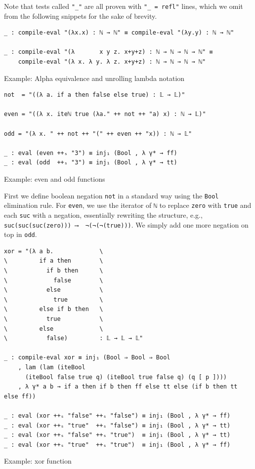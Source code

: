 Note that tests called \verb$"_"$ are all proven with \verb$"_ = refl"$ lines, which we omit from the following snippets for the sake of brevity.

\begin{listing}[H]
\begin{verbatim}
_ : compile-eval "(λx.x) : ℕ → ℕ" ≡ compile-eval "(λy.y) : ℕ → ℕ"

_ : compile-eval "(λ       x y z. x+y+z) : ℕ → ℕ → ℕ → ℕ" ≡
    compile-eval "(λ x. λ y. λ z. x+y+z) : ℕ → ℕ → ℕ → ℕ"
\end{verbatim}
\caption{Example: Alpha equivalence and unrolling lambda notation}
\label{code:examples-generic}
\end{listing}

\begin{listing}[H]
\begin{verbatim}
not  = "((λ a. if a then false else true) : 𝕃 → 𝕃)" 

even = "((λ x. iteℕ true (λa." ++ not ++ "a) x) : ℕ → 𝕃)"

odd = "(λ x. " ++ not ++ "(" ++ even ++ "x)) : ℕ → 𝕃"

_ : eval (even ++ₛ "3") ≡ inj₁ (Bool , λ γ* → ff)
_ : eval (odd  ++ₛ "3") ≡ inj₁ (Bool , λ γ* → tt)
\end{verbatim}
\caption{Example: even and odd functions}
\label{code:examples-evenodd}
\end{listing}

First we define boolean negation \verb$not$ in a standard way using the \verb$Bool$ elimination rule. For \verb$even$, we use the iterator of \verb$ℕ$ to replace \verb$zero$ with \verb$true$ and each \verb$suc$ with a negation, essentially rewriting the structure, e.g., \verb$suc(suc(suc(zero))) ⟶  ¬(¬(¬(true)))$. We simply add one more negation on top in \verb$odd$.

\begin{listing}[H]
\begin{verbatim}
xor = "(λ a b.             \
\         if a then        \
\           if b then      \
\             false        \
\           else           \
\             true         \
\         else if b then   \
\           true           \
\         else             \
\           false)         : 𝕃 → 𝕃 → 𝕃"

_ : compile-eval xor ≡ inj₁ (Bool ⇒ Bool ⇒ Bool
    , lam (lam (iteBool
      (iteBool false true q) (iteBool true false q) (q [ p ])))
    , λ γ* a b → if a then if b then ff else tt else (if b then tt else ff))

_ : eval (xor ++ₛ "false" ++ₛ "false") ≡ inj₁ (Bool , λ γ* → ff)
_ : eval (xor ++ₛ "true"  ++ₛ "false") ≡ inj₁ (Bool , λ γ* → tt)
_ : eval (xor ++ₛ "false" ++ₛ "true")  ≡ inj₁ (Bool , λ γ* → tt)
_ : eval (xor ++ₛ "true"  ++ₛ "true")  ≡ inj₁ (Bool , λ γ* → ff)
\end{verbatim}
\caption{Example: xor function}
\label{code:examples-xor}
\end{listing}

